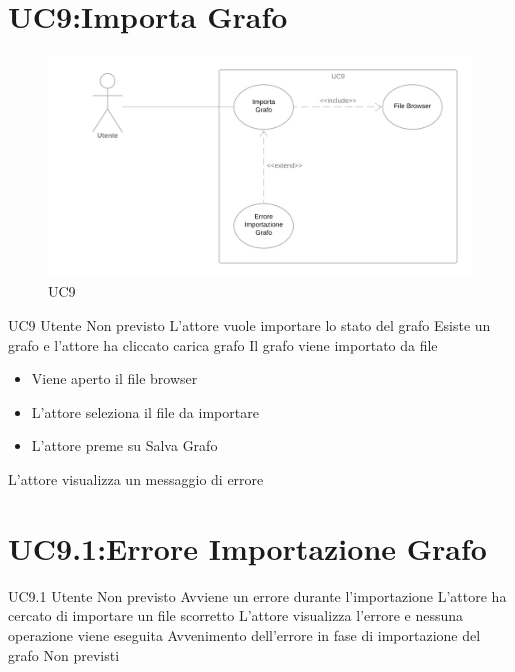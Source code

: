 \documentclass[../AnalisideiRequisiti.tex]{subfiles}
\begin{document}
\section{UC9:Importa Grafo}
\begin{figure}[H]
	\caption{UC9}
	\centering
	\includegraphics[width=\textwidth]{../img/UC09.png}
\end{figure}
\UserCase
{UC9}
{Utente}
{Non previsto}
{L'attore vuole importare lo stato del grafo}
{Esiste un grafo e l'attore ha cliccato carica grafo}
{Il grafo viene importato da file}
{
	\begin{itemize}
			\item{} Viene aperto il file browser
			\item{} L'attore seleziona il file da importare
			\item{} L'attore preme su Salva Grafo
	\end{itemize}
}
{L'attore visualizza un messaggio di errore }
\section{UC9.1:Errore Importazione Grafo}
\UserCase
{UC9.1}
{Utente}
{Non previsto}
{Avviene un errore durante l'importazione}
{L'attore ha cercato di importare un file scorretto}
{L'attore visualizza l'errore e nessuna operazione viene eseguita}
{Avvenimento dell'errore in fase di importazione del grafo}
{Non previsti}
\end{document}
